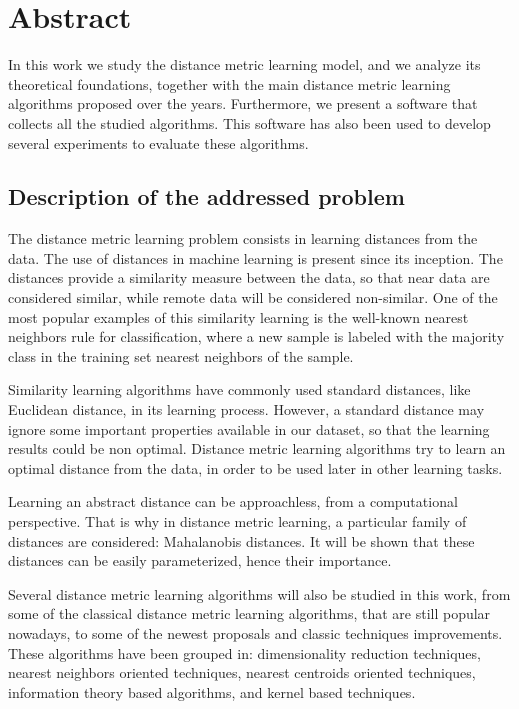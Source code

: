 
\chapter*{Abstract}

In this work we study the distance metric learning model, and we analyze its theoretical foundations, together with the main distance metric learning algorithms proposed over the years. Furthermore, we present a software that collects all the studied algorithms. This software has also been used to develop several experiments to evaluate these algorithms.

\section*{Description of the addressed problem}

The distance metric learning problem consists in learning distances from the data. The use of distances in machine learning is present since its inception. The distances provide a similarity measure between the data, so that near data are considered similar, while remote data will be considered non-similar. One of the most popular examples of this similarity learning is the well-known nearest neighbors rule for classification, where a new sample is labeled with the majority class in the training set nearest neighbors of the sample.

Similarity learning algorithms have commonly used standard distances, like Euclidean distance, in its learning process. However, a standard distance may ignore some important properties available in our dataset, so that the learning results could be non optimal. Distance metric learning algorithms try to learn an optimal distance from the data, in order to be used later in other learning tasks.

Learning an abstract distance can be approachless, from a computational perspective. That is why in distance metric learning, a particular family of distances are considered: Mahalanobis distances. It will be shown that these distances can be easily parameterized, hence their importance.

Several distance metric learning algorithms will also be studied in this work, from some of the classical distance metric learning algorithms, that are still popular nowadays, to some of the newest proposals and classic techniques improvements. These algorithms have been grouped in: dimensionality reduction techniques, nearest neighbors oriented techniques, nearest centroids oriented techniques, information theory based algorithms, and kernel based techniques.


